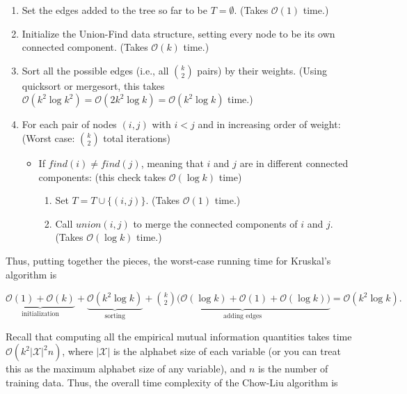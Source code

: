 \begin{enumerate}
\item Set the edges added to the tree so far to be $T=\emptyset$. (Takes $\mathcal{O}(1)$ time.)

\item Initialize the Union-Find data structure, setting every node to be its own connected component. (Takes $\mathcal{O}(k)$ time.)

\item Sort all the possible edges (i.e., all ${k \choose 2}$ pairs) by their weights. (Using quicksort or mergesort, this takes $\mathcal{O}(k^{2}\log k^{2})=\mathcal{O}(2k^{2}\log k)=\mathcal{O}(k^{2}\log k)$ time.)

\item For each pair of nodes $(i,j)$ with $i<j$ and in increasing order of weight: (Worst case: ${k \choose 2}$ total iterations)

\begin{itemize}
\item If $find(i)\ne find(j)$, meaning that $i$ and $j$ are in different connected components: (this check takes $\mathcal{O}(\log k)$ time)

\begin{enumerate}
\item Set $T=T\cup \{ (i,j)\}$. (Takes $\mathcal{O}(1)$ time.)

\item Call $union(i,j)$ to merge the connected components of $i$ and $j$. (Takes $\mathcal{O}(\log k)$ time.)
\end{enumerate}
\end{itemize}
\end{enumerate}

Thus, putting together the pieces, the worst-case running time for Kruskal's algorithm is

{\centering$\underbrace{\mathcal{O}(1)+\mathcal{O}(k)}_{\text {initialization}} +\underbrace{\mathcal{O}(k^{2}\log k)}_{\text {sorting}} +\underbrace{{k \choose 2}\big (\mathcal{O}(\log k)+\mathcal{O}(1)+\mathcal{O}(\log k)\big )}_{\text {adding edges}}=\mathcal{O}(k^{2}\log k).$ \par}
 
Recall that computing all the empirical mutual information quantities takes time $\mathcal{O}(k^{2}|\mathcal{X}|^{2}n)$, where $|\mathcal{X}|$ is the alphabet size of each variable (or you can treat this as the maximum alphabet size of any variable), and $n$ is the number of training data. Thus, the overall time complexity of the Chow-Liu algorithm is

